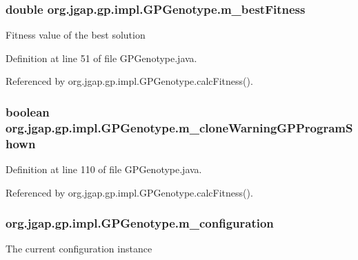 \hypertarget{classorg_1_1jgap_1_1gp_1_1impl_1_1_g_p_genotype_a957b0de7013e1055b66e03223dc890f2}{
\subsubsection[{m\-\_\-best\-Fitness}]{\setlength{\rightskip}{0pt plus 5cm}double org.\-jgap.\-gp.\-impl.\-G\-P\-Genotype.\-m\-\_\-best\-Fitness\hspace{0.3cm}{\ttfamily [private]}}}\label{classorg_1_1jgap_1_1gp_1_1impl_1_1_g_p_genotype_a957b0de7013e1055b66e03223dc890f2}
Fitness value of the best solution 

Definition at line 51 of file G\-P\-Genotype.\-java.



Referenced by org.\-jgap.\-gp.\-impl.\-G\-P\-Genotype.\-calc\-Fitness().

\hypertarget{classorg_1_1jgap_1_1gp_1_1impl_1_1_g_p_genotype_af0ec08e1f1fdf88d76bae2ba6d0fe986}{
\subsubsection[{m\-\_\-clone\-Warning\-G\-P\-Program\-Shown}]{\setlength{\rightskip}{0pt plus 5cm}boolean org.\-jgap.\-gp.\-impl.\-G\-P\-Genotype.\-m\-\_\-clone\-Warning\-G\-P\-Program\-Shown\hspace{0.3cm}{\ttfamily [private]}}}\label{classorg_1_1jgap_1_1gp_1_1impl_1_1_g_p_genotype_af0ec08e1f1fdf88d76bae2ba6d0fe986}


Definition at line 110 of file G\-P\-Genotype.\-java.



Referenced by org.\-jgap.\-gp.\-impl.\-G\-P\-Genotype.\-calc\-Fitness().

\hypertarget{classorg_1_1jgap_1_1gp_1_1impl_1_1_g_p_genotype_a2156c601b24d1a7fdcad1c59ec05e147}{
\subsubsection[{m\-\_\-configuration}]{ org.\-jgap.\-gp.\-impl.\-G\-P\-Genotype.\-m\-\_\-configuration\hspace{0.3cm}{\ttfamily [private]}}}\label{classorg_1_1jgap_1_1gp_1_1impl_1_1_g_p_genotype_a2156c601b24d1a7fdcad1c59ec05e147}
The current configuration instance 

